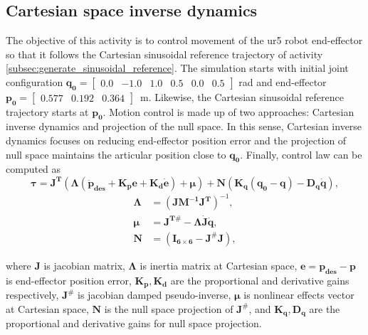 \graphicspath{{images/act_2.1/}}
\subsection{Cartesian space inverse dynamics}
The objective of this activity is to control movement of the ur5 robot end-effector so that it follows the Cartesian sinusoidal reference trajectory of activity \ref{subsec:generate_sinusoidal_reference}. The simulation starts with initial joint configuration $\mathbf{q_0}=\begin{bmatrix} 0.0 & -1.0 & 1.0 & 0.5 & 0.0 & 0.5 \end{bmatrix}$ rad and end-effector $\mathbf{p_0}=\begin{bmatrix}  0.577 &   0.192 &   0.364 \end{bmatrix}$~m. Likewise, the Cartesian sinusoidal reference trajectory starts at $\mathbf{p_0}$. Motion control is made up of two approaches: Cartesian inverse dynamics and projection of the null space. In this sense, Cartesian inverse dynamics focuses on reducing end-effector position error and the projection of null space maintains the articular position close to $\mathbf{q_0}$. Finally, control law can be computed as 
\begin{equation}
	\boldsymbol{\tau}
	= \mathbf{J^T} (\boldsymbol{\Lambda}( \mathbf{\ddot{p}_{des}} + \mathbf{K_p e} + \mathbf{K_d \dot{e}}) + \boldsymbol{\mu})+ \mathbf{N} \left(\mathbf{K_q(q_0-q) - D_q \dot{q}} \right),
	\label{eq:cartesian_idyn_N}
\end{equation} 
\begin{align*}
	\boldsymbol{\Lambda} &= (\mathbf{J M^{-1} J^{T}})^{-1}, \\
	\boldsymbol{\mu} &= \mathbf{J^{T\#}} - \boldsymbol{\Lambda}\mathbf{\dot{J}\dot{q}}, \\
	\mathbf{N} &=(\mathbf{I_{6 \times 6}} - \mathbf{J^{\#} J} ),
\end{align*}

\noindent where $\mathbf{J}$ is jacobian matrix, $\boldsymbol{\Lambda}$ is inertia matrix at Cartesian space, $\mathbf{e}=\mathbf{p_{des} - p}$ is end-effector position error, $\mathbf{K_p, K_d}$ are the proportional and derivative gains respectively, $\mathbf{J^{\#}}$ is jacobian damped pseudo-inverse, $\boldsymbol{\mu}$ is nonlinear effects vector at Cartesian space, $\mathbf{N}$ is the null space projection of $\mathbf{J^{\#}}$, and $\mathbf{K_q, D_q}$ are the proportional and derivative gains for null space projection. \vspace{.5cm}



